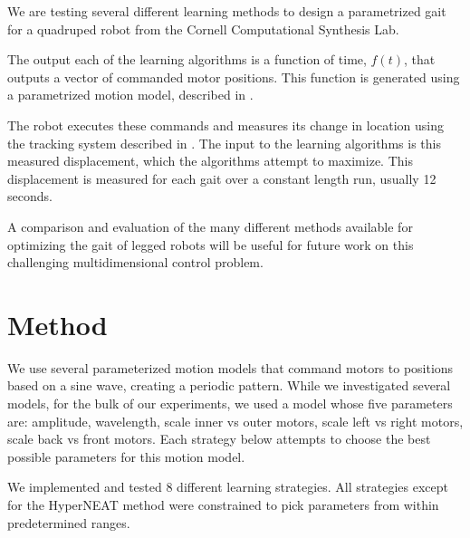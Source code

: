 We are testing several different learning methods to design a
parametrized gait for a quadruped robot from the Cornell Computational
Synthesis Lab.

The output each of the learning algorithms is a function of time,
$f(t)$, that outputs a vector of commanded motor positions.  This
function is generated using a parametrized motion model, described in
.

The robot executes these commands and measures its change in location
using the tracking system described in .  The input
to the learning algorithms is this measured displacement, which the
algorithms attempt to maximize. This displacement is measured for each
gait over a constant length run, usually 12 seconds.

A comparison and evaluation of the many different methods available
for optimizing the gait of legged robots will be useful for future
work on this challenging multidimensional control problem.



\section{Method}


We use several parameterized motion models that command motors to
positions based on a sine wave, creating a periodic pattern.  While we
investigated several models, for the bulk of our experiments, we used
a model whose five parameters are: amplitude, wavelength, scale inner
vs outer motors, scale left vs right motors, scale back vs front
motors. Each strategy below attempts to choose the best possible
parameters for this motion model.  

We implemented and tested 8 different learning strategies.  All
strategies except for the HyperNEAT method\cite{clune} were
constrained to pick parameters from within predetermined ranges.

